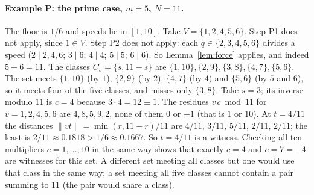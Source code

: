\documentclass[11pt]{article}
\theoremstyle{remark}
\newcommand{\norm}[1]{\lVert #1\rVert}
\begin{document}
\paragraph{Example P: the prime case, $m=5$, $N=11$.} The floor is $1/6$ and speeds lie in $[1,10]$. Take $V=\{1,2,4,5,6\}$. Step P1 does not apply, since $1\in V$. Step P2 does not apply: each $q\in\{2,3,4,5,6\}$ divides a speed ($2\mid2,4,6$; $3\mid6$; $4\mid4$; $5\mid5$; $6\mid6$). So Lemma~\ref{lem:force} applies, and indeed $5+6=11$. The classes $C_s=\{s,11-s\}$ are $\{1,10\},\{2,9\},\{3,8\},\{4,7\},\{5,6\}$. The set meets $\{1,10\}$ (by $1$), $\{2,9\}$ (by $2$), $\{4,7\}$ (by $4$) and $\{5,6\}$ (by $5$ and $6$), so it meets four of the five classes, and misses only $\{3,8\}$. Take $s=3$; its inverse modulo $11$ is $c=4$ because $3\cdot4=12\equiv1$. The residues $v\,c\bmod11$ for $v=1,2,4,5,6$ are $4,8,5,9,2$, none of them $0$ or $\pm1$ (that is $1$ or $10$). At $t=4/11$ the distances $\norm{vt}=\min(r,11-r)/11$ are $4/11,\,3/11,\,5/11,\,2/11,\,2/11$; the least is $2/11\approx0.1818>1/6\approx0.1667$. So $t=4/11$ is a witness. Checking all ten multipliers $c=1,\dots,10$ in the same way shows that exactly $c=4$ and $c=7=-4$ are witnesses for this set. A different set meeting all classes but one would use that class in the same way; a set meeting all five classes cannot contain a pair summing to $11$ (the pair would share a class).
\end{document}

